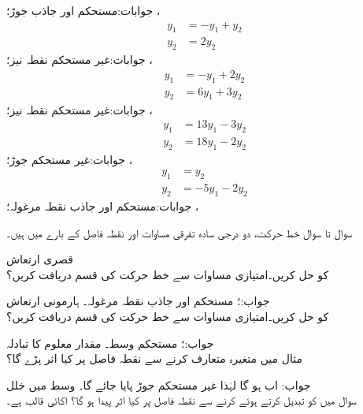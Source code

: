 جوابات:مستحکم اور جاذب جوڑ؛ ، 
\begin{align*}
y_1&=-y_1+y_2\\
y_2&=2y_2
\end{align*}
جوابات:غیر مستحکم نقطہ نیز؛ ، 
\begin{align*}
y_1&=-y_1+2y_2\\
y_2&=6y_1+3y_2
\end{align*}
جوابات:غیر مستحکم نقطہ نیز؛ ، 
\begin{align*}
y_1&=13y_1-3y_2\\
y_2&=18y_1-2y_2
\end{align*}
جوابات:غیر مستحکم جوڑ؛ ، 
\begin{align*}
y_1&=y_2\\
y_2&=-5y_1-2y_2
\end{align*}
جوابات:مستحکم اور جاذب نقطہ مرغولہ؛ ، \\ 

سوال  تا سوال  خط حرکت، دو درجی سادہ تفرقی مساوات اور نقطہ فاصل کے بارے میں ہیں۔

 \quad قصری ارتعاش\\
 کو حل کریں۔امتیازی مساوات سے خط حرکت کی قسم دریافت کریں؟

جواب:؛ مستحکم اور جاذب نقطہ مرغولہ۔
 \quad ہارمونی ارتعاش\\
 کو حل کریں۔امتیازی مساوات سے خط حرکت کی قسم دریافت کریں؟

جواب:؛ مستحکم وسط۔
 \quad مقدار معلوم کا تبادلہ\\
مثال  میں متغیرہ  متعارف کرنے سے نقطہ فاصل پر کیا اثر پڑے گا؟

جواب: اب  ہو گا لہٰذا غیر مستحکم جوڑ پایا جائے گا۔
 \quad وسط میں خلل\\
سوال  میں  کو تبدیل کرتے ہوئے  کرنے سے نقطہ فاصل پر کیا اثر پیدا ہو گا؟   اکائی قالب ہے۔ 

